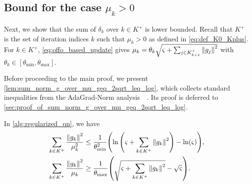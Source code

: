\documentclass[journal_revised_MPC]{subfiles}
\begin{document}
\subsection{Bound for the case \texorpdfstring{$\mu_k > 0$}{mu k > 0}}

Next, we show that the sum of $\delta_{k}$ over $k \in K^+$ is lower bounded.
Recall that $K^+$ is the set of iteration indices $k$ such that $\mu_k > 0$ as defined in \cref{eq:def_K0_Kplus}.
For $k\in K^+$, \cref{eq:offo_based_update} gives $\mu_k=\theta_k \sqrt{\varsigma + \sum_{j \in K^+_{k+1}} \norm{g_{j}}^2}$ with $\theta_k \in [\theta_{\min}, \theta_{\max}]$.

Before proceeding to the main proof, we present \cref{lem:sum_norm_g_over_mu_geq_2sqrt_leq_log}, which collects standard inequalities from the AdaGrad-Norm analysis~\citep[Lemma~3.2]{wardAdaGradStepsizesSharp2020}~\citep[Lemma~3.1]{Gratton08022024}.
Its proof is deferred to \cref{sec:proof_of_sum_norm_g_over_mu_geq_2sqrt_leq_log}.
\begin{lemma}\label{lem:sum_norm_g_over_mu_geq_2sqrt_leq_log}
    In \cref{alg:regularized_qn}, we have
    \begin{align*}
        \sum_{{k} \in K^+}\frac{\norm{g_{k}}^2}{\mu_{k}^2}
         & \le \frac{1}{\theta_{\min}^2} \qty(\ln\qty(\varsigma+\sum_{ k \in K^+} \norm{g_{k}}^2) - \ln(\varsigma)),  \\
        \sum_{{k} \in K^+} \frac{\norm{g_{k}}^2}{\mu_{k}}
         & \ge \frac{1}{\theta_{\max}} \qty(\sqrt{\varsigma + \sum_{{k} \in K^+} \norm{g_{k}}^2} - \sqrt{\varsigma}).
    \end{align*}
\end{lemma}
\end{document}
